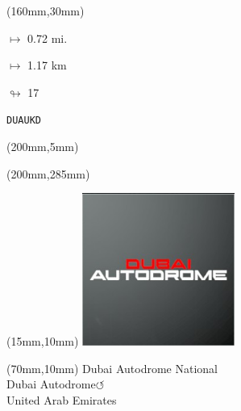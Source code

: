 \begin{textblock*}{40mm}(160mm,30mm)%
\Large
\par$\mapsto$ 0.72 mi.
\par$\mapsto$ 1.17 km
\par$\looparrowright$ 17
\par\hfill\tiny\tt DUAUKD\\
\end{textblock*}
\begin{textblock*}{20mm}(200mm,5mm)%
\fbox{\thepage}
\label{DUAUKD}
\end{textblock*}
\begin{textblock*}{20mm}(200mm,285mm)%
\fbox{\thepage}
\end{textblock*}

\null\newpage
\begin{textblock*}{50mm}(15mm,10mm)%
\includegraphics[width=50mm]{LG/2015-05-20_00081.png}
\end{textblock*}
\begin{textblock*}{130mm}(70mm,10mm)%
{\fontsize{20}{20}\selectfont Dubai Autodrome National\\}
{\fontsize{16}{16}\selectfont Dubai Autodrome\hfill \huge$\circlearrowleft$\\}
{\fontsize{12}{12}\selectfont United Arab Emirates\\}
\end{textblock*}
